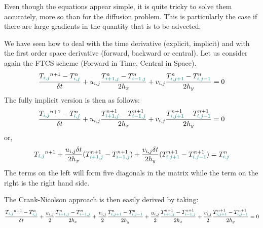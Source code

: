 Even though the equations appear simple, it is quite tricky to solve them accurately, 
more so than for the diffusion problem. 
This is particularly the case if there are large gradients in the quantity that is to be advected. 

We have seen how to deal with the time derivative (explicit, implicit) 
and with the first order space derivative (forward, backward or central).
Let us consider again the FTCS scheme (Forward in Time, Central in Space).
\begin{equation}
\frac{T_{\color{teal}i,j}^{n+1}-T^n_{\color{teal}i,j}}{\delta t} 
+ u_{i,j} \frac{T^n_{\color{teal}i+1,j} - T^n_{{\color{teal}i-1,j}}}{2h_x} 
+ v_{i,j} \frac{T^n_{\color{teal}i,j+1} - T^n_{{\color{teal}i,j-1}}}{2h_y} =0 
\end{equation}
The fully implicit version is then as follows:
\begin{equation}
\frac{T_{\color{teal}i,j}^{n+1}-T^n_{\color{teal}i,j}}{\delta t} 
+ u_{i,j} \frac{T^{n+1}_{\color{teal}i+1,j} - T^{n+1}_{{\color{teal}i-1,j}}}{2h_x} 
+ v_{i,j} \frac{T^{n+1}_{\color{teal}i,j+1} - T^{n+1}_{{\color{teal}i,j-1}}}{2h_y} =0 
\end{equation}
or, 
\[
T_{\color{teal}i,j}^{n+1}   
+\frac{u_{i,j} \delta t}{2 h_x}
(  T^{n+1}_{\color{teal}i+1,j} - T^{n+1}_{{\color{teal}i-1,j}}  )
+\frac{v_{i,j} \delta t}{2 h_y}
(  T^{n+1}_{\color{teal}i,j+1} - T^{n+1}_{{\color{teal}i,j-1}} )
=
T^n_{\color{teal}i,j}
\]
The terms on the left will form five diagonals in the matrix while the term on the right 
is the right hand side.

The Crank-Nicolson approach is then easily derived by taking:
\begin{equation}
\frac{T_{\color{teal}i,j}^{n+1}-T^n_{\color{teal}i,j}}{\delta t} 
+\frac{u_{i,j}}{2} \frac{T^{n}_{\color{teal}i+1,j} - T^{n}_{{\color{teal}i-1,j}}}{2h_x} 
+\frac{v_{i,j}}{2} \frac{T^{n}_{\color{teal}i,j+1} - T^{n}_{{\color{teal}i,j-1}}}{2h_y} 
+\frac{u_{i,j}}{2} \frac{T^{n+1}_{\color{teal}i+1,j} - T^{n+1}_{{\color{teal}i-1,j}}}{2h_x} 
+\frac{v_{i,j}}{2} \frac{T^{n+1}_{\color{teal}i,j+1} - T^{n+1}_{{\color{teal}i,j-1}}}{2h_y} 
=0 
\end{equation}




